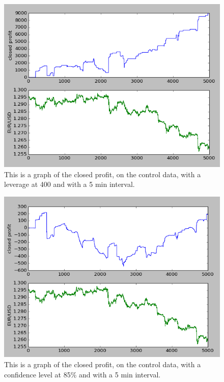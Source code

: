 \documentclass[10pt]{IEEEtran}
\begin{document}
\begin{figure}
    \includegraphics[scale = 0.5]{data-96-10000-400.png}
    \caption{This is a graph of the closed profit, on the control data, with a leverage at 400 and with a 5 min interval.}
\end{figure}

\begin{figure}
    \includegraphics[scale = 0.5]{data-85-10000-20.png}
    \caption{This is a graph of the closed profit, on the control data, with a confidence level at 85\% and with a 5 min interval.}
\end{figure}
\end{document}
